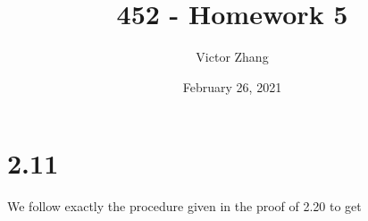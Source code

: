 \documentclass{article}
\title{452 - Homework 5}
\author{Victor Zhang}
\date{February 26, 2021}
\begin{document}
\maketitle

\section*{2.11}
We follow exactly the procedure given in the proof of 2.20 to get


\end{document}
